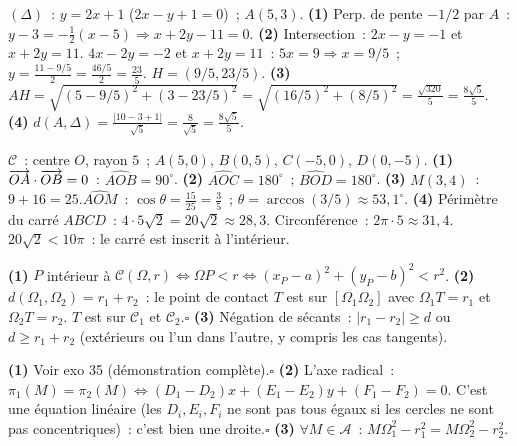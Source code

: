 
$(\Delta)$~: $y=2x+1$ ($2x-y+1=0$)~; $A(5,3)$.
\textbf{(1)} Perp. de pente $-1/2$ par $A$~: $y-3=-\frac{1}{2}(x-5)\Rightarrow x+2y-11=0$.
\textbf{(2)} Intersection~: $2x-y=-1$ et $x+2y=11$.
$4x-2y=-2$ et $x+2y=11$~: $5x=9\Rightarrow x=9/5$~; $y=\frac{11-9/5}{2}=\frac{46/5}{2}=\frac{23}{5}$.
$H=(9/5,23/5)$.
\textbf{(3)} $AH=\sqrt{(5-9/5)^2+(3-23/5)^2}=\sqrt{(16/5)^2+(8/5)^2}=\frac{\sqrt{320}}{5}=\frac{8\sqrt{5}}{5}$.
\textbf{(4)} $d(A,\Delta)=\frac{|10-3+1|}{\sqrt{5}}=\frac{8}{\sqrt{5}}=\frac{8\sqrt{5}}{5}$.\checkmark


$\mathcal{C}$~: centre $O$, rayon $5$~; $A(5,0)$, $B(0,5)$, $C(-5,0)$, $D(0,-5)$.
\textbf{(1)} $\overrightarrow{OA}\cdot\overrightarrow{OB}=0$~: $\widehat{AOB}=90^{\circ}$.
\textbf{(2)} $\widehat{AOC}=180^{\circ}$~; $\widehat{BOD}=180^{\circ}$.
\textbf{(3)} $M(3,4)$~: $9+16=25$.\checkmark\quad $\widehat{AOM}$~: $\cos\theta=\frac{15}{25}=\frac{3}{5}$~; $\theta=\arccos(3/5)\approx53{,}1^{\circ}$.
\textbf{(4)} P\'erim\`etre du carr\'e $ABCD$~: $4\cdot5\sqrt{2}=20\sqrt{2}\approx28{,}3$.
Circonf\'erence~: $2\pi\cdot5\approx31{,}4$. $20\sqrt{2}<10\pi$~: le carr\'e est inscrit \`a l'int\'erieur.


\textbf{(1)} $P$ int\'erieur \`a $\mathcal{C}(\Omega,r)\Leftrightarrow\Omega P<r\Leftrightarrow(x_P-a)^2+(y_P-b)^2<r^2$.
\textbf{(2)} $d(\Omega_1,\Omega_2)=r_1+r_2$~: le point de contact $T$ est sur $[\Omega_1\Omega_2]$
avec $\Omega_1T=r_1$ et $\Omega_2T=r_2$. $T$ est sur $\mathcal{C}_1$ et $\mathcal{C}_2$.\hfill$\square$
\textbf{(3)} N\'egation de \og s\'ecants\fg~: $|r_1-r_2|\geq d$ ou $d\geq r_1+r_2$
(ext\'erieurs ou l'un dans l'autre, y compris les cas tangents).


\textbf{(1)} Voir exo 35 (d\'emonstration compl\`ete).\hfill$\square$
\textbf{(2)} L'axe radical~: $\pi_1(M)=\pi_2(M)\Leftrightarrow(D_1-D_2)x+(E_1-E_2)y+(F_1-F_2)=0$.
C'est une \'equation lin\'eaire (les $D_i,E_i,F_i$ ne sont pas tous \'egaux si les cercles ne sont pas concentriques)~: c'est bien une droite.\hfill$\square$
\textbf{(3)} $\forall M\in\mathcal{A}$~: $M\Omega_1^2-r_1^2=M\Omega_2^2-r_2^2$.

